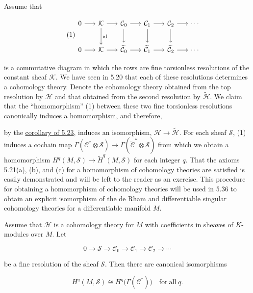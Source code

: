 \label{thm:5.24} Assume that

\begin{equation}
\tag{1}\label{eq:5.24:1}
\begin{tikzcd}[ampersand replacement=\&, column sep=1.6em,row sep=2em]
0 \arrow[r] \& \mathcal K \arrow[r] \arrow[d ,"{\mathrm{id}}"] \& \mathcal C_0 \arrow[r] \arrow[d] \& \mathcal C_1 \arrow[r] \arrow[d] \& \mathcal C_2 \arrow[r] \arrow[d] \& \cdots \\
0 \arrow[r] \& \mathcal K \arrow[r] \& \widetilde{\mathcal C}_0 \arrow[r] \& \widetilde{\mathcal C}_1 \arrow[r] \& \widetilde{\mathcal C}_2 \arrow[r] \& \cdots
\end{tikzcd}
\end{equation}

is a commutative diagram in which the rows are fine torsionless resolutions of the constant sheaf $\mathcal{K}$. We have seen in 5.20 that each of these resolutions determines a cohomology theory. Denote the cohomology theory obtained from the top resolution by $\mathcal{H}$ and that obtained from the second resolution by $\tilde{\mathcal{H}}$. We claim that the “homomorphism” (1) between these two fine torsionless resolutions canonically induces a homomorphism, and therefore,

by the \hyperref[thm:5.23]{corollary of 5.23}, induces an isomorphism, $\mathcal{H} \to \tilde{\mathcal{H}}$. For each sheaf $\mathcal{S}$, (1) induces a cochain map $\Gamma(\mathcal{C}^* \otimes \mathcal{S}) \to \Gamma(\widetilde{\mathcal{C}}^* \otimes \mathcal{S})$ from which we obtain a homomorphism $H^q(M,\mathcal{S}) \to \tilde{H}^q(M,\mathcal{S})$ for each integer $q$. That the axioms \hyperref[thm:5.21]{5.21(a)}, (b), and (c) for a homomorphism of cohomology theories are satisfied is easily demonstrated and will be left to the reader as an exercise. This procedure for obtaining a homomorphism of cohomology theories will be used in 5.36 to obtain an explicit isomorphism of the de Rham and differentiable singular cohomology theories for a differentiable manifold $M$.

\begin{theorem}\label{thm:5.25}
Assume that $\mathcal{H}$ is a cohomology theory for $M$ with coefficients in sheaves of $K$-modules over $M$. Let

\begin{equation}
\tag{1}\label{eq:5.25:1}
0\to\mathcal{S}\to\mathcal{C}_{0}\to\mathcal{C}_{1}\to\mathcal{C}_{2}\to\cdots
\end{equation}

be a fine resolution of the sheaf $\mathcal{S}$. Then there are canonical isomorphisms 

\begin{equation}
\tag{2}\label{eq:5.25:2}
H^{q}(M,\mathcal{S})\cong H^{q}\bigl(\Gamma(\mathcal{C}^{*})\bigr)\quad\mathrm{for\ all}\;q.
\end{equation}

\end{theorem}

